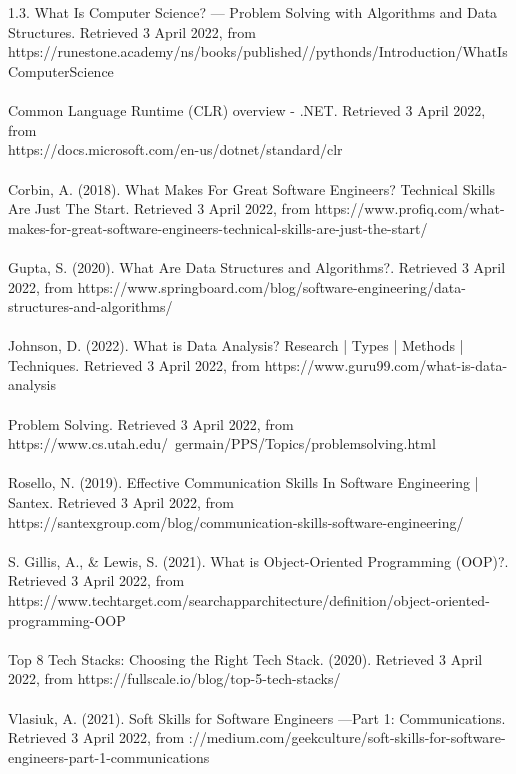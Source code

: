 \documentclass[a4paper, 11pt]{report}
\begin{document}
	\\
	\\
	1.3. What Is Computer Science? — Problem Solving with Algorithms and Data Structures. Retrieved 3 April 2022, from \\https://runestone.academy/ns/books/published//pythonds/Introduction/WhatIsComputerScience
	\\
	\\
	Common Language Runtime (CLR) overview - .NET. Retrieved 3 April 2022, from \\https://docs.microsoft.com/en-us/dotnet/standard/clr
	\\
	\\
	Corbin, A. (2018). What Makes For Great Software Engineers? Technical Skills Are Just The Start. Retrieved 3 April 2022, from https://www.profiq.com/what-makes-for-great-software-engineers-technical-skills-are-just-the-start/
	\\
	\\
	Gupta, S. (2020). What Are Data Structures and Algorithms?. Retrieved 3 April 2022, from https://www.springboard.com/blog/software-engineering/data-structures-and-algorithms/
	\\
	\\
	Johnson, D. (2022). What is Data Analysis? Research | Types | Methods | Techniques. Retrieved 3 April 2022, from https://www.guru99.com/what-is-data-analysis
	\\
	\\
	Problem Solving. Retrieved 3 April 2022, from
	\\https://www.cs.utah.edu/~germain/PPS/Topics/problemsolving.html
	\\
	\\
	Rosello, N. (2019). Effective Communication Skills In Software Engineering | Santex. Retrieved 3 April 2022, from https://santexgroup.com/blog/communication-skills-software-engineering/
	\\
	\\
	S. Gillis, A., & Lewis, S. (2021). What is Object-Oriented Programming (OOP)?. Retrieved 3 April 2022, from https://www.techtarget.com/searchapparchitecture/definition/object-oriented-programming-OOP
	\\
	\\
	Top 8 Tech Stacks: Choosing the Right Tech Stack. (2020). Retrieved 3 April 2022, from https://fullscale.io/blog/top-5-tech-stacks/
	\\
	\\
	Vlasiuk, A. (2021). Soft Skills for Software Engineers —Part 1: Communications. Retrieved 3 April 2022, from \https://medium.com/geekculture/soft-skills-for-software-engineers-part-1-communications
\end{document}
